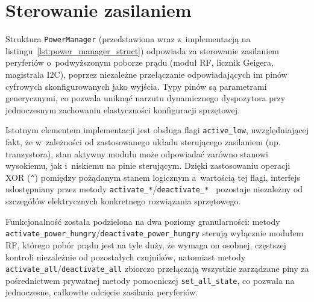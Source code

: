 \section{Sterowanie zasilaniem}
Struktura \texttt{PowerManager} (przedstawiona wraz z~implementacją 
na listingu~\ref{lst:power_manager_struct}) odpowiada za sterowanie zasilaniem 
peryferiów o~podwyższonym poborze prądu (moduł RF, licznik 
Geigera, magistrala I2C), poprzez niezależne przełączanie 
odpowiadających im pinów cyfrowych skonfigurowanych jako 
wyjścia. Typy pinów są parametrami generycznymi, co pozwala 
uniknąć narzutu dynamicznego dyspozytora przy jednoczesnym 
zachowaniu elastyczności konfiguracji sprzętowej.

Istotnym elementem implementacji jest obsługa flagi \texttt{active\_low}, 
uwzględniającej fakt, że w~zależności od zastosowanego 
układu sterującego zasilaniem (np. tranzystora), stan 
aktywny modułu może odpowiadać zarówno stanowi wysokiemu, 
jak i~niskiemu na pinie sterującym. Dzięki zastosowaniu operacji 
XOR (\texttt{\^}) pomiędzy pożądanym stanem logicznym a~wartością tej 
flagi, interfejs udostępniany przez metody \texttt{activate\_*}/\texttt{deactivate\_* }
pozostaje niezależny od szczegółów elektrycznych konkretnego 
rozwiązania sprzętowego.

Funkcjonalność została podzielona na dwa poziomy granularności: 
metody \texttt{activate\_power\_hungry}/\texttt{deactivate\_power\_hungry} sterują 
wyłącznie modułem RF, którego pobór prądu jest na tyle duży, 
że wymaga on osobnej, częstszej kontroli niezależnie od 
pozostałych czujników, natomiast metody 
\texttt{activate\_all}/\texttt{deactivate\_all} zbiorczo przełączają wszystkie 
zarządzane piny za pośrednictwem prywatnej metody pomocniczej 
\texttt{set\_all\_state}, co pozwala na jednoczesne, całkowite odcięcie 
zasilania peryferiów.

